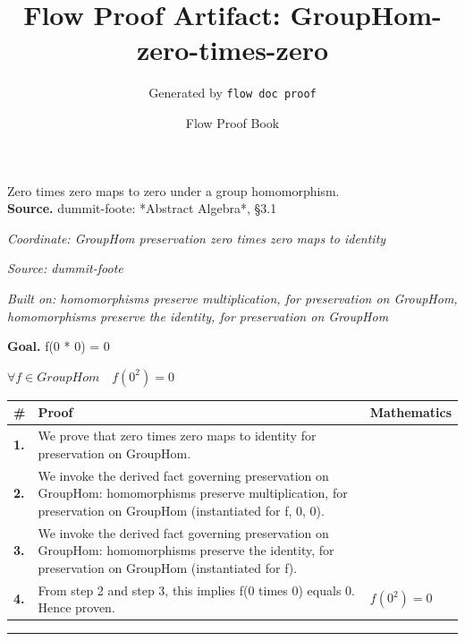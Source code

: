 \documentclass[11pt]{article}
\title{Flow Proof Artifact: GroupHom-zero-times-zero}
\author{Generated by \texttt{flow doc proof}}
\date{Flow Proof Book}
\theoremstyle{definition}
\begin{document}
\maketitle
Zero times zero maps to zero under a group homomorphism.\\[0.5em]
\textbf{Source.} dummit-foote: *Abstract Algebra*, §3.1\\[0.5em]
\bigskip
{}\par
\smallskip\noindent\textit{Coordinate: GroupHom \cdot preservation \cdot zero times zero maps to identity}\par
\smallskip\noindent\textit{Source: dummit-foote}\par
\smallskip\noindent\textit{Built on: homomorphisms preserve multiplication, for preservation on GroupHom, homomorphisms preserve the identity, for preservation on GroupHom}\par
\medskip
\noindent\textbf{Goal.} f(0 * 0) = 0\par
\noindent$\displaystyle \forall f \in GroupHom\quad f(0^{2}) = 0$\par
\medskip
\noindent
\begin{tabular}{@{} >{\raggedright\arraybackslash}p{} >{\raggedright\arraybackslash}p{} >{\raggedleft\arraybackslash}p{} @{}}
\textbf{\#} & \textbf{Proof} & \textbf{Mathematics} \\
\midrule
\textbf{1.} & We prove that zero times zero maps to identity for preservation on GroupHom. & \\[0.45em]
\textbf{2.} & We invoke the derived fact governing preservation on GroupHom: homomorphisms preserve multiplication, for preservation on GroupHom (instantiated for f, 0, 0). & \\[0.45em]
\textbf{3.} & We invoke the derived fact governing preservation on GroupHom: homomorphisms preserve the identity, for preservation on GroupHom (instantiated for f). & \\[0.45em]
\textbf{4.} & From step 2 and step 3, this implies f(0 times 0) equals 0. Hence proven. & $\displaystyle f(0^{2}) = 0$ \\[0.45em]
\bottomrule
\end{tabular}
\label{thm:GroupHom-preservation-zero_times_zero_maps_to_identity}
\par\medskip\hrule
\end{document}

